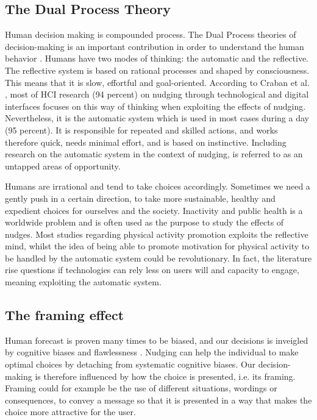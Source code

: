 \subsection{The Dual Process Theory}
Human decision making is compounded process. The Dual Process theories of decision-making is an important contribution in order to understand the human behavior \cite{caraban_23_2019}.
Humans have two modes of thinking: the automatic and the reflective. The reflective system is based on rational processes and shaped by consciousness. This means that it is slow, effortful and goal-oriented. According to Craban et al. \cite{caraban_23_2019}, most of HCI research (94 percent) on nudging through technological and digital interfaces focuses on this way of thinking when exploiting the effects of nudging. Nevertheless, it is the automatic system which is used in most cases during a day (95 percent). It is responsible for repeated and skilled actions, and works therefore quick, needs minimal effort, and is based on instinctive. Including research on the automatic system in the context of nudging, is referred to as an untapped areas of opportunity.

Humans are irrational and tend to take choices accordingly. Sometimes we need a gently push in a certain direction, to take more sustainable, healthy and expedient choices for ourselves and the society. Inactivity and public health is a worldwide problem  and  is  often  used  as  the  purpose  to  study  the  effects  of  nudges.  Most  studies regarding physical activity promotion exploits the reflective mind, whilst the idea of being able to promote motivation for physical activity to be handled by the automatic system could be revolutionary. In fact, the literature rise questions if technologies can rely less on users will and capacity to engage, meaning exploiting the automatic system.  

\subsection{The framing effect}
Human forecast is proven many times to be biased, and our decisions is inveigled by cognitive biases and flawlessness  \cite{thaler_nudge-_2009}.
Nudging can help the individual to make optimal choices by detaching from systematic cognitive biases.
Our decision-making is therefore influenced by how the choice is presented, i.e. its framing. Framing could for example be the use of different situations, wordings or consequences, to convey a message so that it is presented in a way that makes the choice more attractive for the user. 

